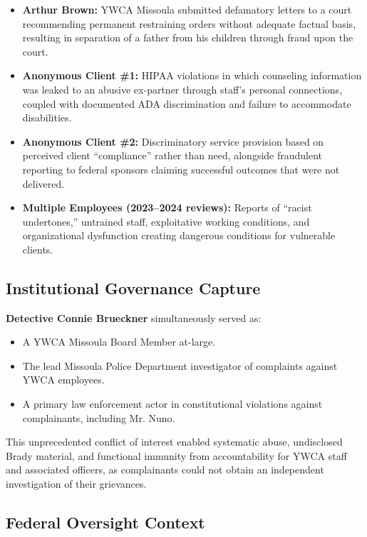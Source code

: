 \documentclass[12pt,oneside]{article}
\begin{document}
\begin{flushleft}
\begin{itemize}
\item \textbf{Arthur Brown:} YWCA Missoula submitted defamatory letters to a court recommending permanent restraining orders without adequate factual basis, resulting in separation of a father from his children through fraud upon the court.
\item \textbf{Anonymous Client \#1:} HIPAA violations in which counseling information was leaked to an abusive ex-partner through staff’s personal connections, coupled with documented ADA discrimination and failure to accommodate disabilities.
\item \textbf{Anonymous Client \#2:} Discriminatory service provision based on perceived client “compliance” rather than need, alongside fraudulent reporting to federal sponsors claiming successful outcomes that were not delivered.
\item \textbf{Multiple Employees (2023--2024 reviews):} Reports of “racist undertones,” untrained staff, exploitative working conditions, and organizational dysfunction creating dangerous conditions for vulnerable clients.
\end{itemize}

\subsection*{Institutional Governance Capture}

\textbf{Detective Connie Brueckner} simultaneously served as:

\begin{itemize}
\item A YWCA Missoula Board Member at-large.
\item The lead Missoula Police Department investigator of complaints against YWCA employees.
\item A primary law enforcement actor in constitutional violations against complainants, including Mr. Nuno.
\end{itemize}

This unprecedented conflict of interest enabled systematic abuse, undisclosed Brady material, and functional immunity from accountability for YWCA staff and associated officers, as complainants could not obtain an independent investigation of their grievances.

\subsection*{Federal Oversight Context}


\end{flushleft}
\end{document}
